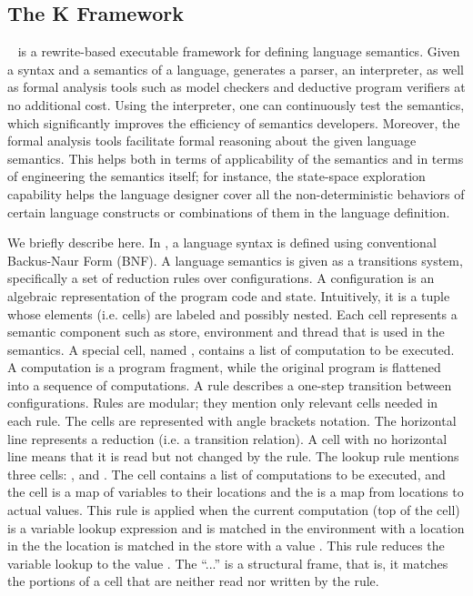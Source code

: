 \subsection{The \textbf{K} Framework}
\K~\cite{rosu-serbanuta-2013-k} is a rewrite-based executable framework for defining language semantics.
Given a syntax and a semantics of a language, \K generates a parser, an interpreter, as well as formal analysis tools such as model checkers and deductive program verifiers at no additional cost.
Using the interpreter, one can continuously test the semantics, which significantly improves the efficiency of semantics developers. 
Moreover, the formal analysis tools facilitate formal reasoning about the given language semantics.
This helps both in terms of applicability of the semantics and in terms of engineering the semantics itself; for instance, the state-space exploration capability helps the language designer cover all the non-deterministic behaviors of certain language constructs or combinations of them in the language definition.

We briefly describe \K here. In \K, a language syntax is defined using conventional Backus-Naur Form (BNF).
A language semantics is given as a transitions system, specifically a set of reduction rules over configurations.
A configuration is an algebraic representation of the program code and state.
Intuitively, it is a tuple whose elements (i.e. cells) are labeled and possibly nested. 
Each cell represents a semantic component such as store, environment and thread that is used in the semantics.
A special cell, named , contains a list of computation to be executed.
A computation is a program fragment, while the original program is flattened into a sequence of computations.
A rule describes a one-step transition between configurations.
Rules are modular; they mention only relevant cells needed in each rule.
The cells are represented with angle brackets notation.
The horizontal line represents a reduction (i.e. a transition relation).
A cell with no horizontal line means that it is read but not changed by the rule.
The lookup rule mentions three cells: ,  and .
The  cell contains a list of computations to be executed, and the  cell is a map of variables to their locations and the  is a map from locations to actual values.
This rule is applied when the current computation (top of the  cell) is a variable lookup expression  and  is matched in the environment with a location  in the the location  is matched in the store with a value .
This rule reduces the variable lookup  to the value .
The ``...'' is a structural frame, that is, it matches the portions of a cell that are neither read nor written by the rule.

